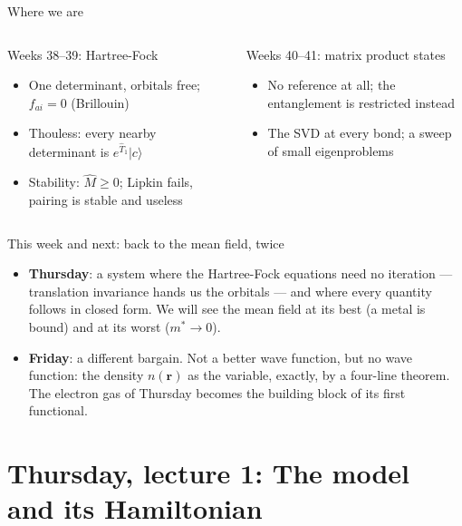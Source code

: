 \documentclass[aspectratio=169,10pt]{beamer}
\newcommand{\ket}[1]{\vert #1\rangle}
\begin{document}
\begin{frame}[shrink=3]{Where we are}
  \small
  \begin{columns}[T]
    \begin{block}{Weeks 38--39: Hartree-Fock}
      \begin{itemize}
        \item One determinant, orbitals free; $f_{ai}=0$ (Brillouin)
        \item Thouless: every nearby determinant is $e^{\hat T_1}\ket c$
        \item Stability: $\hat M\ge0$; Lipkin fails, pairing is stable and useless
      \end{itemize}
    \end{block}
    \begin{block}{Weeks 40--41: matrix product states}
      \begin{itemize}
        \item No reference at all; the entanglement is restricted instead
        \item The SVD at every bond; a sweep of small eigenproblems
      \end{itemize}
    \end{block}
  \end{columns}
  \vspace{0.5em}
  \begin{block}{This week and next: back to the mean field, twice}
    \begin{itemize}
      \item \textbf{Thursday}: a system where the Hartree-Fock equations need no iteration --- translation invariance hands us the orbitals --- and where every quantity follows in closed form. We will see the mean field at its best (a metal is bound) and at its worst ($m^{*}\to0$).
      \item \textbf{Friday}: a different bargain. Not a better wave function, but \alert{no wave function}: the density $n(\bm r)$ as the variable, exactly, by a four-line theorem. The electron gas of Thursday becomes the building block of its first functional.
    \end{itemize}
  \end{block}
\end{frame}

\section{Thursday, lecture 1: The model and its Hamiltonian}
\end{document}
